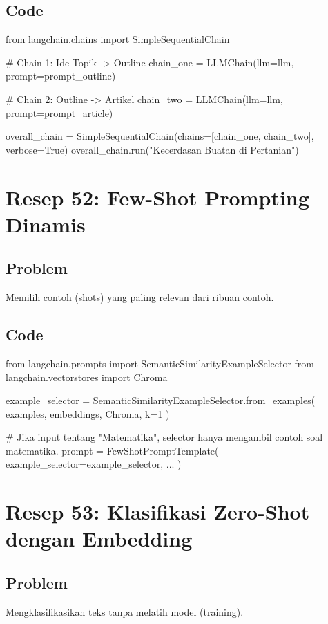 \subsection*{Code}
\begin{codeblock}[language=Python]
from langchain.chains import SimpleSequentialChain

# Chain 1: Ide Topik -> Outline
chain_one = LLMChain(llm=llm, prompt=prompt_outline)

# Chain 2: Outline -> Artikel
chain_two = LLMChain(llm=llm, prompt=prompt_article)

overall_chain = SimpleSequentialChain(chains=[chain_one, chain_two], verbose=True)
overall_chain.run("Kecerdasan Buatan di Pertanian")
\end{codeblock}

\newpage

\section{Resep 52: Few-Shot Prompting Dinamis}

\subsection*{Problem}
Memilih contoh (shots) yang paling relevan dari ribuan contoh.

\subsection*{Code}
\begin{codeblock}[language=Python]
from langchain.prompts import SemanticSimilarityExampleSelector
from langchain.vectorstores import Chroma

example_selector = SemanticSimilarityExampleSelector.from_examples(
    examples,
    embeddings,
    Chroma,
    k=1
)

# Jika input tentang "Matematika", selector hanya mengambil contoh soal matematika.
prompt = FewShotPromptTemplate(
    example_selector=example_selector,
    ...
)
\end{codeblock}

\newpage

\section{Resep 53: Klasifikasi Zero-Shot dengan Embedding}

\subsection*{Problem}
Mengklasifikasikan teks tanpa melatih model (training).


